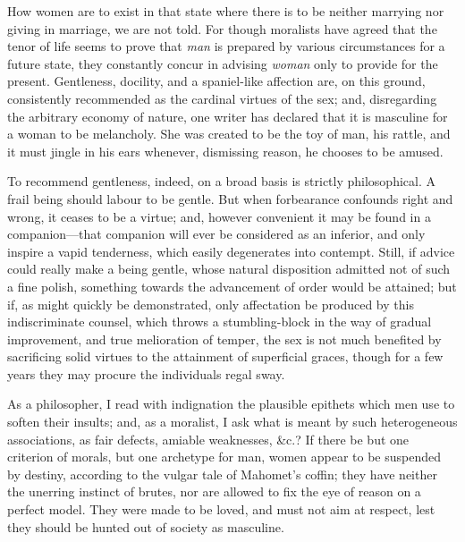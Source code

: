 How women are to exist in that state where there is to be neither
marrying nor giving in marriage, we are not told. For though moralists
have agreed that the tenor of life seems to prove that \textit{man} is
prepared by various circumstances for a future state, they constantly
concur in advising \textit{woman} only to provide for the present.
Gentleness, docility, and a spaniel-like affection are, on this
ground, consistently recommended as the cardinal virtues  of
the sex; and, disregarding the arbitrary economy of nature, one writer
has declared that it is masculine for a woman to be melancholy. She
was created to be the toy of man, his rattle, and it must jingle in
his ears whenever, dismissing reason, he chooses to be amused.


To recommend gentleness, indeed, on a broad basis is strictly
philosophical. A frail being should labour to be gentle. But when
forbearance confounds right and wrong, it ceases to be a virtue; and,
however convenient it may be found in a com\-pan\-ion---that companion
will ever be considered as an inferior, and only inspire a vapid
tenderness, which easily degenerates into contempt. Still, if advice
could really make a being gentle, whose natural disposition admitted
not of such a fine polish, something towards the advancement of order
would be attained; but if, as might quickly be demonstrated, only
affectation be produced by this indiscriminate counsel, which throws a
stumbling-block in the way of gradual improvement, and true
melioration of temper, the sex is not much benefited by sacrificing
solid virtues to the attainment of superficial graces, though for a
few years  they may procure the individuals regal sway.

As a philosopher, I read with indignation the plausible epithets which
men use to soften their insults; and, as a moralist, I ask what is
meant by such heterogeneous associations, as fair defects, amiable
weaknesses, \&c.? If there be but one criterion of morals, but one
archetype for man, women appear to be suspended by destiny, according
to the vulgar tale of Mahomet's coffin; they have neither the unerring
instinct of brutes, nor are allowed to fix the eye of reason on a
perfect model. They were made to be loved, and must not aim at
respect, lest they should be hunted out of society as masculine.

